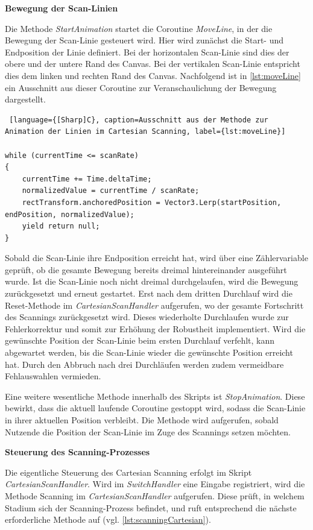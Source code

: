 \textbf{Bewegung der Scan-Linien}

Die Methode \textit{StartAnimation} startet die Coroutine \textit{MoveLine}, in der die Bewegung der Scan-Linie gesteuert wird. Hier wird zunächst die Start- und Endposition der Linie definiert. Bei der horizontalen Scan-Linie sind dies der obere und der untere Rand des Canvas. Bei der vertikalen Scan-Linie entspricht dies dem linken und rechten Rand des Canvas. Nachfolgend ist in \autoref{lst:moveLine} ein Ausschnitt aus dieser Coroutine zur Veranschaulichung der Bewegung dargestellt. 

\begin{lstlisting} [language={[Sharp]C}, caption=Ausschnitt aus der Methode zur Animation der Linien im Cartesian Scanning, label={lst:moveLine}]

while (currentTime <= scanRate)
{
    currentTime += Time.deltaTime;
    normalizedValue = currentTime / scanRate;
    rectTransform.anchoredPosition = Vector3.Lerp(startPosition, endPosition, normalizedValue);
    yield return null;
}
\end{lstlisting}

Sobald die Scan-Linie ihre Endposition erreicht hat, wird über eine Zählervariable geprüft, ob die gesamte Bewegung bereits dreimal hintereinander ausgeführt wurde. Ist die Scan-Linie noch nicht dreimal durchgelaufen, wird die Bewegung zurückgesetzt und erneut gestartet. Erst nach dem dritten Durchlauf wird die Reset-Methode im \textit{CartesianScanHandler} aufgerufen, wo der gesamte Fortschritt des Scannings zurückgesetzt wird. Dieses wiederholte Durchlaufen wurde zur Fehlerkorrektur und somit zur Erhöhung der Robustheit implementiert. Wird die gewünschte Position der Scan-Linie beim ersten Durchlauf verfehlt, kann abgewartet werden, bis die Scan-Linie wieder die gewünschte Position erreicht hat. Durch den Abbruch nach drei Durchläufen werden zudem vermeidbare Fehlauswahlen vermieden.

Eine weitere wesentliche Methode innerhalb des Skripts ist \textit{StopAnimation}. Diese bewirkt, dass die aktuell laufende Coroutine gestoppt wird, sodass die Scan-Linie in ihrer aktuellen Position verbleibt. Die Methode wird aufgerufen, sobald Nutzende die Position der Scan-Linie im Zuge des Scannings setzen möchten.

\textbf{Steuerung des Scanning-Prozesses}

Die eigentliche Steuerung des Cartesian Scanning erfolgt im Skript \textit{CartesianScanHandler}. Wird im \textit{SwitchHandler} eine Eingabe registriert, wird die Methode Scanning im \textit{CartesianScanHandler} aufgerufen. Diese prüft, in welchem Stadium sich der Scanning-Prozess befindet, und ruft entsprechend die nächste erforderliche Methode auf (vgl. \autoref{lst:scanningCartesian}). 

